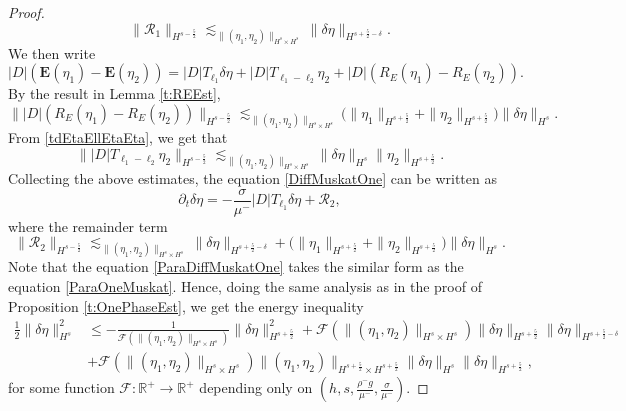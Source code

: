 \documentclass[10pt,a4paper]{amsart}
\newcommand{\R}{\mathbb{R}}
\newcommand{\f}{\frac}
\newcommand{\p}{\partial}
\begin{document}
\begin{proof}
\begin{equation*}
\|\mathcal{R}_1\|_{H^{s-\f52}}\lesssim_{\|(\eta_1, \eta_2)\|_{H^s \times H^s}} \|\delta\eta\|_{H^{s+\f52 -\delta}}.
\end{equation*}
We then write 
\begin{equation*}
 |D|(\mathbf{E}(\eta_1) - \mathbf{E}(\eta_2)) = |D|T_{\ell_1}\delta\eta + |D|T_{\ell_1 - \ell_2}\eta_2 + |D|(R_E(\eta_1)-R_E(\eta_2)).
\end{equation*}
By the result in Lemma \ref{t:REEst}, 
\begin{equation*}
 \||D|(R_E(\eta_1)-R_E(\eta_2))\|_{H^{s-\f52}} \lesssim_{\|(\eta_1, \eta_2)\|_{H^s \times H^s}}  \Big(\|\eta_1\|_{H^{s+\f52}}+ \|\eta_2\|_{H^{s+\f52}} \Big) \|\delta \eta\|_{H^s}.
\end{equation*}
From \eqref{tdEtaEllEtaEta}, we get that
\begin{equation*}
 \| |D|T_{\ell_1 - \ell_2}\eta_2\|_{H^{s-\f52}} \lesssim_{\|(\eta_1, \eta_2)\|_{H^s \times H^s}}  \| \delta \eta\|_{H^s}\|\eta_2\|_{H^{s+\f52}}.
\end{equation*}
Collecting the above estimates, the equation \eqref{DiffMuskatOne} can be written as
\begin{equation} \label{ParaDiffMuskatOne}
\p_t\delta \eta=-\f{\sigma}{\mu^-}|D|T_{\ell_1}\delta\eta+\mathcal{R}_2,
\end{equation}
where the remainder term
\begin{equation*}
\|\mathcal{R}_2\|_{H^{s-\f52}}\lesssim_{\|(\eta_1, \eta_2)\|_{H^s \times H^s}} \|\delta\eta\|_{H^{s+\f52-\delta}} +\Big(\|\eta_1\|_{H^{s+\f52}}+\|\eta_2\|_{H^{s+\f52}}\Big)\| \delta \eta\|_{H^s}.
\end{equation*}
Note that the equation \eqref{ParaDiffMuskatOne} takes the similar form as the equation \eqref{ParaOneMuskat}.
Hence, doing the same analysis as in the proof of Proposition \ref{t:OnePhaseEst}, we get the energy inequality
\begin{align*}
\f12 \|\delta \eta \|^2_{H^s} &\leq - \f{1}{\mathcal{F}(\|(\eta_1, \eta_2)\|_{H^s\times H^s})} \|\delta \eta \|^2_{H^{s+\f52}} + \mathcal{F}(\|(\eta_1, \eta_2)\|_{H^s\times H^s}) \|\delta \eta\|_{H^{s+\f52}} \|\delta \eta\|_{H^{s+\f52-\delta}} \\
&+ \mathcal{F}(\|(\eta_1, \eta_2)\|_{H^s\times H^s})\|(\eta_1, \eta_2)\|_{H^{s+\f52}\times H^{s+\f52}}  \|\delta \eta\|_{H^s} \|\delta \eta\|_{H^{s+\f52}},
\end{align*}
for some function $\mathcal{F}: \R^+ \rightarrow \R^+$ depending only on $(h,s,\frac{\rho^- g}{\mu^-},\frac{\sigma}{\mu^-})$.

\end{proof}
\end{document}
